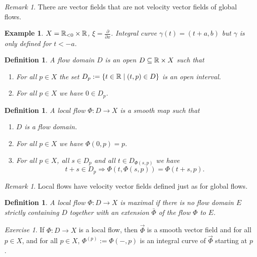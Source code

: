 \documentclass[A4paper, british, reqno]{amsart}
\theoremstyle{darkgreentheorem}
\theoremstyle{darkbluedefinition}
\newtheorem{defn}[thm]{Definition}
\theoremstyle{darkredexample}
\newtheorem{exa}[thm]{Example}
\theoremstyle{remark}
\newtheorem{rem}[thm]{Remark}
\newtheorem{exe}[thm]{Exercise}
\newcommand{\1}{\mathbbm{1}}
\newcommand{\db}{\marginnote{\dbend}}
\newcommand{\tms}{\times}
\newcommand{\sub}{\subseteq}
\begin{document}
\begin{rem}
    \db There are vector fields that are not velocity vector fields of global flows.
\end{rem}

\begin{exa}
    $X=\R_{<0}\tms \R$, $\xi=\frac{\partial }{\partial x}$.
    Integral curve $\gamma(t)=(t+a,b)$ but $\gamma$ is only defined for $t<-a$.
\end{exa}

\begin{defn}
    A \textit{flow domain} $D$ is an open $D\sub \R\tms X$ such that
    \begin{enumerate}
	\item For all $p\in X$ the set $D_{p}:=\{t\in \mathbb{R}\mid (t,p)\in D\}$ is an open interval.
	\item For all $p\in X$ we have $0\in D_{p}$.
    \end{enumerate}
\end{defn}

\begin{defn}
    A \textit{local flow} $\Phi\colon D\to X$ is a smooth map such that
    \begin{enumerate}
	\item $D$ is a flow domain.
	\item For all $p\in X$ we have $\Phi(0,p)=p$.
	\item For all $p\in X$, all $s\in D_{p}$ and all $t\in D_{\Phi(s,p)}$ we have
	    \[ t+s\in D_{p}\Rightarrow \Phi(t,\Phi(s,p))=\Phi(t+s,p).\]
    \end{enumerate}
\end{defn}

\begin{rem}
    Local flows have velocity vector fields defined just as for global flows.
\end{rem}

\begin{defn}
    A local flow $\Phi\colon D\to X$ is \textit{maximal} if there is no flow domain $E$ strictly containing $D$ together with an extension $\bar{\Phi}$ of the flow $\Phi$ to $E$.
\end{defn}

\begin{exe}
    If $\Phi\colon D\to X$ is a local flow, then $\vec{\Phi}$ is a smooth vector field and for all $p\in X$, and for all $p\in X$, $\Phi^{(p)}:=\Phi(-,p)$ is an integral curve of $\vec{\Phi}$ starting at $p$.
\end{exe}
\end{document}
